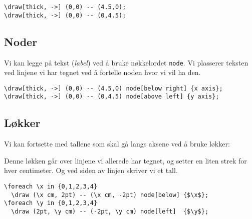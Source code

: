 \documentclass[11pt, a4paper]{article}
\begin{document}
\begin{Verbatim}[fontsize=\small]
\draw[thick, ->] (0,0) -- (4.5,0);
\draw[thick, ->] (0,0) -- (0,4.5);
\end{Verbatim}

\newpage


\subsection{Noder}
Vi kan legge på tekst (\textit{label}) ved å bruke nøkkelordet \texttt{node}. Vi plasserer teksten ved linjene vi har tegnet ved å fortelle noden hvor vi vil ha den.

\begin{center}
\end{center}

\begin{Verbatim}[fontsize=\small]
\draw[thick, ->] (0,0) -- (4.5,0) node[below right] {x axis};
\draw[thick, ->] (0,0) -- (0,4.5) node[above left] {y axis};
\end{Verbatim}


\subsection{Løkker}
\noindent Vi kan fortsette med tallene som skal gå langs aksene ved å bruke løkker:
\begin{center}
\end{center}

Denne løkken går over linjene vi allerede har tegnet, og setter en liten strek for hver centimeter. Og ved siden av linjen skriver vi et tall.

\begin{Verbatim}[fontsize=\small, frame=single]
\foreach \x in {0,1,2,3,4}
  \draw (\x cm, 2pt) -- (\x cm, -2pt) node[below] {$\x$};
\foreach \y in {0,1,2,3,4}
  \draw (2pt, \y cm) -- (-2pt, \y cm) node[left]  {$\y$};
\end{Verbatim}
\end{document}
